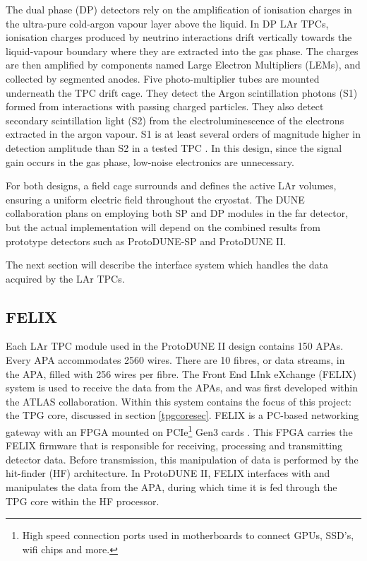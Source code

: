 \documentclass[10pt]{article}
\begin{document}
The dual phase (DP) detectors rely on the amplification of ionisation charges in the ultra-pure cold-argon vapour layer above the liquid. In DP LAr TPCs, ionisation charges produced by neutrino interactions drift vertically towards the liquid-vapour boundary where they are extracted into the gas phase. The charges are then amplified by components named Large Electron Multipliers (LEMs), and collected by segmented anodes. Five photo-multiplier tubes are mounted underneath the TPC drift cage. They detect the Argon scintillation photons (S1) formed from interactions with passing charged particles. They also detect secondary scintillation light (S2) from the electroluminescence of the electrons extracted in the argon vapour. S1 is at least several orders of magnitude higher in detection amplitude than S2 in a tested TPC \cite{aimard20184}. In this design, since the signal gain occurs in the gas phase, low-noise electronics are unnecessary.

For both designs, a field cage surrounds and defines the active LAr volumes, ensuring a uniform electric field throughout the cryostat. The DUNE collaboration plans on employing both SP and DP modules in the far detector, but the actual implementation will depend on the combined results from prototype detectors such as ProtoDUNE-SP and ProtoDUNE II. 

The next section will describe the interface system which handles the data acquired by the LAr TPCs.

\subsection{FELIX}

Each LAr TPC module used in the ProtoDUNE II design contains 150 APAs. Every APA accommodates 2560 wires. There are 10 fibres, or data streams, in the APA, filled with 256 wires per fibre. The Front End LInk eXchange (FELIX) system is used to receive the data from the APAs, and was first developed within the ATLAS collaboration. Within this system contains the focus of this project: the TPG core, discussed in section \ref{tpgcoresec}. FELIX is a PC-based networking gateway with an FPGA mounted on PCIe\footnote{High speed connection ports used in motherboards to connect GPUs, SSD's, wifi chips and more.} Gen3 cards \cite{borga2019felix}. This FPGA carries the FELIX firmware that is responsible for receiving, processing and transmitting detector data. Before transmission, this manipulation of data is performed by the hit-finder (HF) architecture. In ProtoDUNE II, FELIX interfaces with and manipulates the data from the APA, during which time it is fed through the TPG core within the HF processor. 
\end{document}
